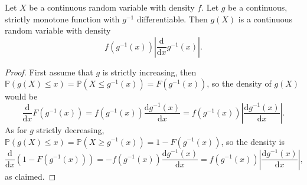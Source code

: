 \begin{theorem}
    Let $X$ be a continuous random variable with density $f$.
    Let $g$ be a continuous, strictly monotone function with $g^{-1}$ differentiable.
    Then $g(X)$ is a continuous random variable with density
    \[
        f(g^{-1}(x))\left| \frac{\mathrm{d}}{\mathrm{d}x}g^{-1}(x) \right|. 
    \]
\end{theorem}
\begin{proof}
    First assume that $g$ is strictly increasing, then $\mathbb P(g(X)\le x)=\mathbb P(X\le g^{-1}(x))=F(g^{-1}(x))$, so the density of $g(X)$ would be
    $$\frac{\mathrm d}{\mathrm dx}F(g^{-1}(x))=f(g^{-1}(x))\frac{\mathrm dg^{-1}(x)}{\mathrm dx}=f(g^{-1}(x))\left|\frac{\mathrm dg^{-1}(x)}{\mathrm dx}\right|.$$
    As for $g$ strictly decreasing, $\mathbb P(g(X)\le x)=\mathbb P(X\ge g^{-1}(x))=1-F(g^{-1}(x))$, so the density is
    $$\frac{\mathrm d}{\mathrm dx}(1-F(g^{-1}(x)))=-f(g^{-1}(x))\frac{\mathrm dg^{-1}(x)}{\mathrm dx}=f(g^{-1}(x))\left|\frac{\mathrm dg^{-1}(x)}{\mathrm dx}\right|,$$
    as claimed.
\end{proof}
